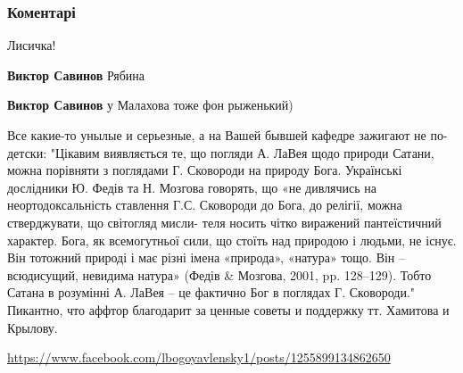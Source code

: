  
 
 
 
 
\subsubsection{Коментарі}
\label{sec:23_10_2021.fb.bilchenko_evgenia.1.marafon_konferencia_chelovechnost.cmt}

\begin{itemize} %
Лисичка!

\begin{itemize} %
\textbf{Виктор Савинов} Рябина

\textbf{Виктор Савинов} у Малахова тоже фон рыженький)
\end{itemize} %


Все какие-то унылые и серьезные, а на Вашей бывшей кафедре зажигают не
по-детски: "Цікавим виявляється те, що погляди А. ЛаВея щодо природи Сатани,
можна порівняти з поглядами Г. Сковороди на природу Бога. Українські дослідники
Ю. Федів та Н. Мозгова говорять, що «не дивлячись на неортодоксальність
ставлення Г.С. Сковороди до Бога, до релігії, можна стверджувати, що світогляд
мисли- теля носить чітко виражений пантеїстичний характер. Бога, як
всемогутньої сили, що стоїть над природою і людьми, не існує. Він тотожний
природі і має різні імена «природа», «натура» тощо. Він – всюдисущий, невидима
натура» (Федів \& Мозгова, 2001, pp. 128–129). Тобто Сатана в розумінні А. ЛаВея
– це фактично Бог в поглядах Г. Сковороди." Пикантно, что аффтор благодарит за
ценные советы и поддержку тт. Хамитова и Крылову. 

\url{https://www.facebook.com/lbogoyavlensky1/posts/1255899134862650}

\end{itemize} %
